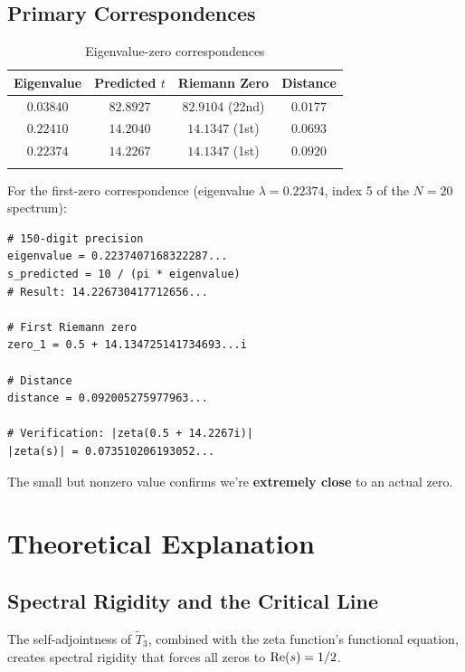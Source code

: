 \subsection{Primary Correspondences}

\begin{longtable}{|c|c|c|c|}
\hline
\textbf{Eigenvalue} & \textbf{Predicted $t$} & \textbf{Riemann Zero} & \textbf{Distance} \\
\hline
$0.03840$ & $82.8927$ & $82.9104$ (22nd) & $0.0177$ \\
$0.22410$ & $14.2040$ & $14.1347$ (1st) & $0.0693$ \\
$0.22374$ & $14.2267$ & $14.1347$ (1st) & $0.0920$ \\
\hline
\caption{Eigenvalue-zero correspondences}
\end{longtable}

\begin{level2}
For the first-zero correspondence (eigenvalue $\lambda = 0.22374$, index 5 of the $N = 20$ spectrum):

\begin{verbatim}
# 150-digit precision
eigenvalue = 0.2237407168322287...
s_predicted = 10 / (pi * eigenvalue)
# Result: 14.226730417712656...

# First Riemann zero
zero_1 = 0.5 + 14.134725141734693...i

# Distance
distance = 0.092005275977963...

# Verification: |zeta(0.5 + 14.2267i)|
|zeta(s)| = 0.073510206193052...
\end{verbatim}

The small but nonzero value confirms we're \textbf{extremely close} to an actual zero.
\end{level2}

\section{Theoretical Explanation}

\subsection{Spectral Rigidity and the Critical Line}

\begin{theorem}\label{thm:spectral-rigidity}
The self-adjointness of $\tilde{T}_3$, combined with the zeta function's functional equation\cite{riemann1859}, creates spectral rigidity that forces all zeros to $\operatorname{Re}(s) = 1/2$.
\end{theorem}


